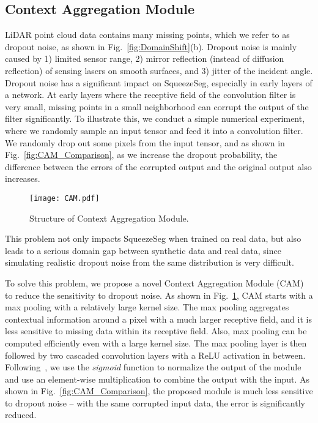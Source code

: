 \documentclass[letterpaper, 10 pt, conference]{ieeeconf}
\begin{document}
\subsection{Context Aggregation Module}
\label{ssec:CAM}
LiDAR point cloud data contains many missing points, which we refer to as dropout noise, as shown in Fig.~\ref{fig:DomainShift}(b). Dropout noise is mainly caused by 1) limited sensor range, 2) mirror reflection (instead of diffusion reflection) of sensing lasers on smooth surfaces, and 3) jitter of the incident angle. Dropout noise has a significant impact on SqueezeSeg, especially in early layers of a network. At early layers where the receptive field of the convolution filter is very small, missing points in a small neighborhood can corrupt the output of the filter significantly. To illustrate this, we conduct a simple numerical experiment, where we randomly sample an input tensor and feed it into a  convolution filter. We randomly drop out some pixels from the input tensor, and as shown in Fig.~\ref{fig:CAM_Comparison}, as we increase the dropout probability, the difference between the errors of the corrupted output and the original output also increases. 


\begin{figure}[!t]
\begin{center}
\centering \texttt{[image: CAM.pdf]}


\caption{Structure of Context Aggregation Module.}
\vspace{-0.6cm}
\label{fig:CAM}
\end{center}
\end{figure}

This problem not only impacts SqueezeSeg when trained on real data, but also leads to a serious domain gap between synthetic data and real data, since simulating realistic dropout noise from the same distribution is very difficult.

To solve this problem, we propose a novel Context Aggregation Module (CAM) to reduce the sensitivity to dropout noise. As shown in Fig.~\ref{fig:CAM}, CAM starts with a max pooling with a relatively large kernel size. The max pooling aggregates contextual information around a pixel with a much larger receptive field, and it is less sensitive to missing data within its receptive field. Also, max pooling can be computed efficiently even with a large kernel size. The max pooling layer is then followed by two cascaded convolution layers with a ReLU activation in between. Following~\cite{hu2018squeeze}, we use the \textit{sigmoid} function to normalize the output of the module and use an element-wise multiplication to combine the output with the input. As shown in Fig.~\ref{fig:CAM_Comparison}, the proposed module is much less sensitive to dropout noise -- with the same corrupted input data, the error is significantly reduced.
\end{document}
